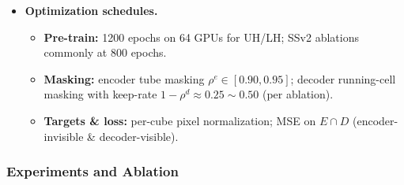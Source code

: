 \begin{enrichment}
\begin{enrichment}
\begin{itemize}
                \item \textbf{Optimization schedules.}
                \begin{itemize}
                    \item \textbf{Pre-train:} 1200 epochs on 64 GPUs for UH/LH; SSv2 ablations commonly at 800 epochs.
                    \item \textbf{Masking:} encoder tube masking $\rho^{e}\in[0.90,0.95]$; decoder running-cell masking with keep-rate $1-\rho^{d}\approx 0.25\sim 0.50$ (per ablation).
                    \item \textbf{Targets \& loss:} per-cube pixel normalization; MSE on $E\cap D$ (encoder-invisible \& decoder-visible).
                \end{itemize}
            \end{itemize}
            
            \subsubsection{Experiments and Ablation}
            \label{subsubsec_chapter24_videomaev2_experiments}
            

\end{enrichment}
\end{enrichment}
